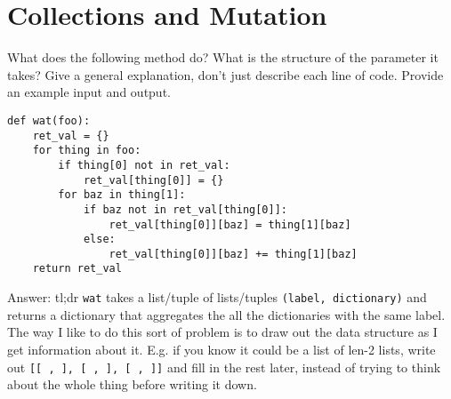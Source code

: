\documentclass[11pt]{article}
\begin{document}

\section{Collections and Mutation}
What does the following method do? What is the structure of the parameter it takes? Give a general explanation, don't just describe each line of code. Provide an example input and output. 
\begin{verbatim}
def wat(foo):
    ret_val = {}
    for thing in foo:
        if thing[0] not in ret_val:
            ret_val[thing[0]] = {}
        for baz in thing[1]:
            if baz not in ret_val[thing[0]]:
                ret_val[thing[0]][baz] = thing[1][baz]
            else:
                ret_val[thing[0]][baz] += thing[1][baz]
    return ret_val
\end{verbatim}
Answer: tl;dr \texttt{wat} takes a list/tuple of lists/tuples \texttt{(label, dictionary)} and returns a dictionary that aggregates the all the dictionaries with the same label. The way I like to do this sort of problem is to draw out the data structure as I get information about it. E.g. if you know it could be a list of len-2 lists, write out \texttt{[[   ,    ], [   ,   ], [   ,   ]]} and fill in the rest later, instead of trying to think about the whole thing before writing it down.
\end{document}
